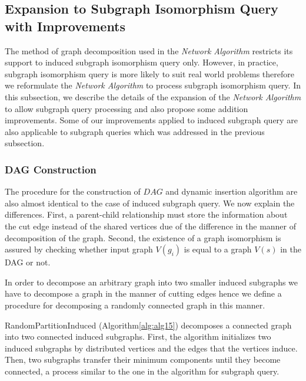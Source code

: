 \subsection{Expansion to Subgraph Isomorphism Query with Improvements}
The method of graph decomposition used in the \textit{Network Algorithm} restricts its  support to induced subgraph isomorphism query only. However, in practice,  subgraph isomorphism query is more likely to suit real world problems therefore we reformulate the \textit{Network Algorithm} to process subgraph isomorphism query. In this subsection, we describe the details of the expansion of the \textit{Network Algorithm} to allow subgraph query processing and also propose some addition improvements. Some of our improvements applied to induced subgraph query are also applicable to subgraph queries which was addressed in the previous subsection. 


\subsubsection{DAG Construction}
The procedure for the construction of $DAG$ and dynamic insertion algorithm are also almost identical to the case of induced subgraph query.
We now explain the differences. First, a parent-child relationship must store the information about the cut edge instead of the 
shared vertices due of the difference in the manner of decomposition of the graph. Second, the existence of a graph isomorphism is 
assured by checking whether input graph $V(g_i)$ is equal to a graph $V(s)$ in the DAG or not.

In order to decompose an arbitrary graph into two smaller induced subgraphs we have to decompose a graph in the manner of cutting edges
hence we define a procedure for decomposing a randomly connected graph in this manner.

RandomPartitionInduced (Algorithm\ref{alg:alg15}) decomposes a connected graph into two connected induced subgraphs.
First, the algorithm initializes two induced subgraphs by distributed vertices and the edges that the vertices induce.
Then, two subgraphs transfer their minimum components until they become connected, a process similar to the one in the 
algorithm for subgraph query.

